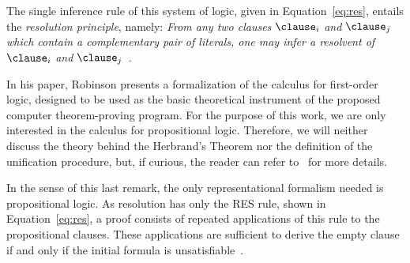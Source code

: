 The single inference rule of this system of logic, given in
Equation~\ref{eq:res}, entails the \emph{resolution principle}, namely:
\emph{From any two clauses} $\clause_i$ \emph{and} $\clause_j$ \emph{which
contain a complementary pair of literals, one may infer a resolvent of}
$\clause_i$ \emph{and} $\clause_j$~\cite{Robinson65}.   

In his paper, Robinson presents a formalization of the calculus for first-order
logic, designed to be used as the basic theoretical instrument of the proposed
computer theorem-proving program. For the purpose of this work, we are only
interested in the calculus for propositional logic. Therefore, we will neither
discuss the theory behind the Herbrand's Theorem nor the definition of the
unification procedure, but, if curious, the reader can refer
to~\cite{Robinson65} for more details.

In the sense of this last remark, the only representational formalism needed is
propositional logic. As resolution has only the RES rule, shown in
Equation~\ref{eq:res}, a proof consists of repeated applications of this rule to
the propositional clauses. These applications are sufficient to derive the empty
clause if and only if the initial formula is unsatisfiable~\cite{satchapter}.

